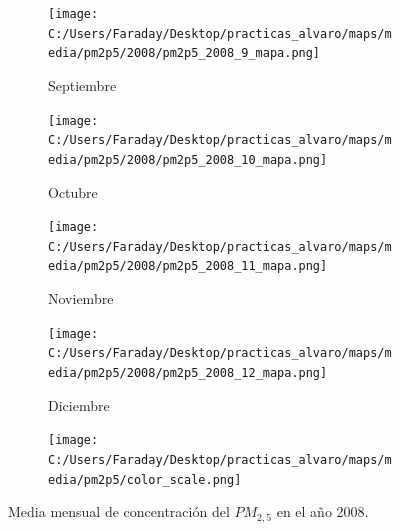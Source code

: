 \documentclass[12pt]{beamer}
\begin{document}
\begin{frame}[squeeze]
\begin{figure}[H]
\begin{subfigure}[H]{0.20\textwidth}
\texttt{[image: C:/Users/Faraday/Desktop/practicas\_alvaro/maps/media/pm2p5/2008/pm2p5\_2008\_9\_mapa.png]}
\captionsetup{labelformat=empty}
\caption{\scriptsize Septiembre}
\label{fig:map-pm2p5-2008-9}
\end{subfigure}
%
\begin{subfigure}[H]{0.20\textwidth}
\texttt{[image: C:/Users/Faraday/Desktop/practicas\_alvaro/maps/media/pm2p5/2008/pm2p5\_2008\_10\_mapa.png]}
\captionsetup{labelformat=empty}
\caption{\scriptsize Octubre}
\label{fig:map-pm2p5-2008-10}
\end{subfigure}
%
\begin{subfigure}[H]{0.20\textwidth}
\texttt{[image: C:/Users/Faraday/Desktop/practicas\_alvaro/maps/media/pm2p5/2008/pm2p5\_2008\_11\_mapa.png]}
\captionsetup{labelformat=empty}
\caption{\scriptsize Noviembre}
\label{fig:map-pm2p5-2008-11}
\end{subfigure}
%
\begin{subfigure}[H]{0.20\textwidth}
\texttt{[image: C:/Users/Faraday/Desktop/practicas\_alvaro/maps/media/pm2p5/2008/pm2p5\_2008\_12\_mapa.png]}
\captionsetup{labelformat=empty}
\caption{\scriptsize Diciembre}
\label{fig:map-pm2p5-2008-12}
\end{subfigure}

\begin{subfigure}[H]{0.45\textwidth}
\texttt{[image: C:/Users/Faraday/Desktop/practicas\_alvaro/maps/media/pm2p5/color\_scale.png]}
\captionsetup{labelformat=empty}
\caption{}
\end{subfigure}

\vspace*{-7mm}
\caption{\scriptsize Media mensual de concentración del $PM_{2,5}$ en el año 2008.}
\label{fig:map-pm2p5-2008}
\end{figure}
\end{frame}
\end{document}
